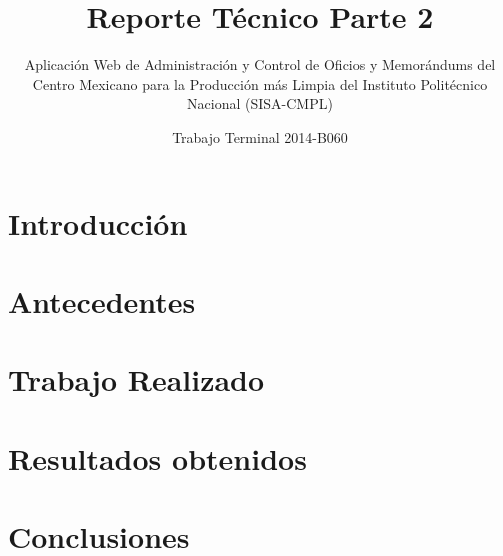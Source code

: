 \documentclass[oneside,10pt]{book}
\title{Reporte Técnico Parte 2}
\subtitle{Aplicación Web de Administración y Control de Oficios y Memorándums del Centro Mexicano para la Producción más Limpia del Instituto Politécnico Nacional (SISA-CMPL)}
\author{Trabajo Terminal 2014-B060}
\begin{document}
\maketitle
\thispagestyle{empty}

\frontmatter
\tableofcontents

\mainmatter

\chapter{Introducción}


\chapter{Antecedentes}


\chapter{Trabajo Realizado}


\chapter{Resultados obtenidos}


\chapter{Conclusiones}

\end{document}
